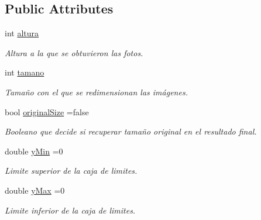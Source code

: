 \subsection*{Public Attributes}
\begin{DoxyCompactItemize}
\item 
\mbox{\label{classuav_1_1Stitcher_a4dc4cd0546fef7f43b85d9079ea09f86}} 
int \mbox{\hyperlink{classuav_1_1Stitcher_a4dc4cd0546fef7f43b85d9079ea09f86}{altura}}
\begin{DoxyCompactList}\small\item\em Altura a la que se obtuvieron las fotos. \end{DoxyCompactList}\item 
\mbox{\label{classuav_1_1Stitcher_aecfe8592eb3d8445c0f3e8b722558acb}} 
int \mbox{\hyperlink{classuav_1_1Stitcher_aecfe8592eb3d8445c0f3e8b722558acb}{tamano}}
\begin{DoxyCompactList}\small\item\em Tamaño con el que se redimensionan las imágenes. \end{DoxyCompactList}\item 
\mbox{\label{classuav_1_1Stitcher_a222f8247abb4fafba61d86078d8f9c16}} 
bool \mbox{\hyperlink{classuav_1_1Stitcher_a222f8247abb4fafba61d86078d8f9c16}{original\+Size}} =false
\begin{DoxyCompactList}\small\item\em Booleano que decide si recuperar tamaño original en el resultado final. \end{DoxyCompactList}\item 
\mbox{\label{classuav_1_1Stitcher_a4b793c80fbb1052781b3787e90d19f97}} 
double \mbox{\hyperlink{classuav_1_1Stitcher_a4b793c80fbb1052781b3787e90d19f97}{y\+Min}} =0
\begin{DoxyCompactList}\small\item\em Limite superior de la caja de limites. \end{DoxyCompactList}\item 
\mbox{\label{classuav_1_1Stitcher_ae5ef4cb4ade964a9ff73c8228db26f6a}} 
double \mbox{\hyperlink{classuav_1_1Stitcher_ae5ef4cb4ade964a9ff73c8228db26f6a}{y\+Max}} =0
\begin{DoxyCompactList}\small\item\em Limite inferior de la caja de limites. \end{DoxyCompactList}\item 

\end{DoxyCompactItemize}

